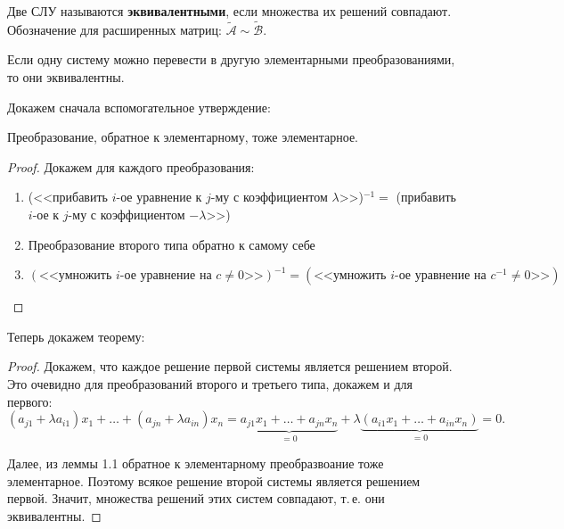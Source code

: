 \begin{definition}
    Две СЛУ называются \textbf{эквивалентными}, если множества их решений совпадают. Обозначение для расширенных матриц: $\widetilde{\mathcal{A}} \sim \widetilde{\mathcal{B}}$.
\end{definition}

\begin{theorem}
    Если одну систему можно перевести в другую элементарными преобразованиями, то они \mbox{эквивалентны}.
\end{theorem}

Докажем сначала вспомогательное утверждение:

\begin{lemma}
    Преобразование, обратное к элементарному, тоже элементарное.
\end{lemma}

\begin{proof}
    Докажем для каждого преобразования:
    \begin{enumerate}[nolistsep]
        \item (<<прибавить $i$-ое уравнение к $j$-му с коэффициентом $\lambda$>>)$^{-1} = {}$ (прибавить $i$-ое к $j$-му с коэффициентом $-\lambda$>>)
        \item Преобразование второго типа обратно к самому себе
        \item $(\text{<<умножить $i$-ое уравнение на $c \ne 0$>>})^{-1} = (\text{<<умножить $i$-ое уравнение на $c^{-1} \ne 0$>>})$
    \end{enumerate}
\end{proof}

Теперь докажем теорему:

\begin{proof}
    Докажем, что каждое решение первой системы является решением второй. Это очевидно для преобразований второго и третьего типа, докажем и для первого:
    $$
    (a_{j1} + \lambda a_{i1})x_1 + \ldots + (a_{jn} + \lambda a_{in})x_n = \underbrace{a_{j1}x_1 + \ldots + a_{jn}x_n}_{{} = 0} + \lambda\underbrace{(a_{i1}x_1 + \ldots + a_{in}x_n)}_{{} = 0} = 0.
    $$

    Далее, из леммы 1.1 обратное к элементарному преобразвоание тоже элементарное. Поэтому всякое решение второй системы является решением первой. Значит, множества решений этих систем совпадают, т.\,е. они эквивалентны.
\end{proof}

